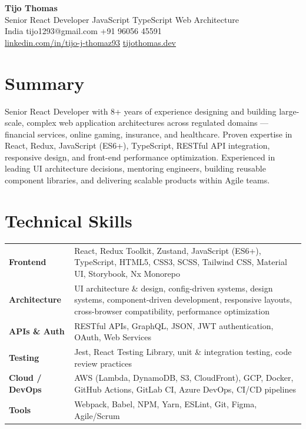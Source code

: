 \documentclass[11pt,a4paper]{article}
\begin{document}
\begin{center}
{\LARGE \textbf{Tijo Thomas}} \\[4pt]
{\large Senior React Developer \textbar{} JavaScript \textbar{} TypeScript \textbar{} Web Architecture} \\[6pt]
India \enspace\textbar\enspace
tijo1293@gmail.com \enspace\textbar\enspace
+91 96056 45591 \\[2pt]
\href{https://linkedin.com/in/tijo-j-thomaz93}{linkedin.com/in/tijo-j-thomaz93} \enspace\textbar\enspace
\href{https://tijothomas.dev}{tijothomas.dev}
\end{center}

\section*{Summary}

Senior React Developer with 8+ years of experience designing and building large-scale, complex web application architectures across regulated domains — financial services, online gaming, insurance, and healthcare. Proven expertise in React, Redux, JavaScript (ES6+), TypeScript, RESTful API integration, responsive design, and front-end performance optimization. Experienced in leading UI architecture decisions, mentoring engineers, building reusable component libraries, and delivering scalable products within Agile teams.

\section*{Technical Skills}

\begin{tabular}{@{} p{2.8cm} p{14cm} @{}}
\textbf{Frontend} & React, Redux Toolkit, Zustand, JavaScript (ES6+), TypeScript, HTML5, CSS3, SCSS, Tailwind CSS, Material UI, Storybook, Nx Monorepo \\[3pt]
\textbf{Architecture} & UI architecture \& design, config-driven systems, design systems, component-driven development, responsive layouts, cross-browser compatibility, performance optimization \\[3pt]
\textbf{APIs \& Auth} & RESTful APIs, GraphQL, JSON, JWT authentication, OAuth, Web Services \\[3pt]
\textbf{Testing} & Jest, React Testing Library, unit \& integration testing, code review practices \\[3pt]
\textbf{Cloud / DevOps} & AWS (Lambda, DynamoDB, S3, CloudFront), GCP, Docker, GitHub Actions, GitLab CI, Azure DevOps, CI/CD pipelines \\[3pt]
\textbf{Tools} & Webpack, Babel, NPM, Yarn, ESLint, Git, Figma, Agile/Scrum \\
\end{tabular}
\end{document}
